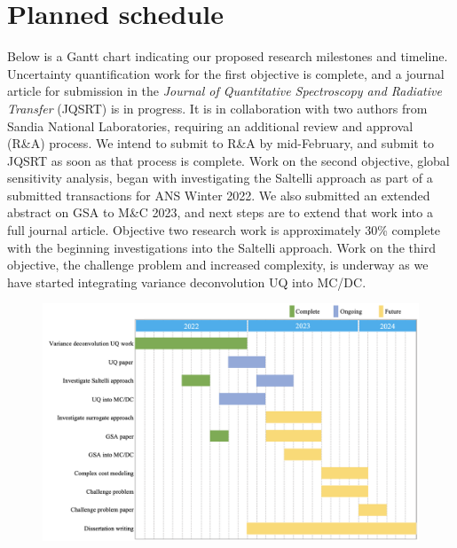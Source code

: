 \chapter{Planned schedule} \label{ch-schedule}
Below is a Gantt chart indicating our proposed research milestones and timeline. Uncertainty quantification work for the first objective is complete, and a journal article for submission in the \textit{Journal of Quantitative Spectroscopy and Radiative Transfer} (JQSRT) is in progress. It is in collaboration with two authors from Sandia National Laboratories, requiring an additional review and approval (R\&A) process. We intend to submit to R\&A by mid-February, and submit to JQSRT as soon as that process is complete. 
Work on the second objective, global sensitivity analysis, began with investigating the Saltelli approach as part of a submitted transactions for ANS Winter 2022. We also submitted an extended abstract on GSA to M\&C 2023, and next steps are to extend that work into a full journal article. Objective two research work is approximately 30\% complete with the beginning investigations into the Saltelli approach. 
Work on the third objective, the challenge problem and increased complexity, is underway as we have started integrating variance deconvolution UQ into MC/DC.

\begin{figure}[ht]
    \centering
    \centerline{\includegraphics[scale=0.5]{Figures/gantt-third.png}}
    \label{fig:gantt}
\end{figure}
